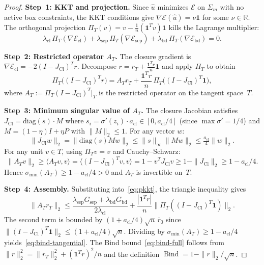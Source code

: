 \documentclass[lettersize,journal]{IEEEtran}
\DeclareMathOperator{\Cl}{Cl}
\DeclareMathOperator{\Bind}{Bind}
\begin{document}
\begin{proof}
\textbf{Step~1: KKT and projection.} Since $\hat{u}$ minimizes $\mathcal{E}$ on $\Sigma_m$ with no active box constraints, the KKT conditions give $\nabla\mathcal{E}(\hat{u}) = \nu\mathbf{1}$ for some $\nu \in \mathbb{R}$. The orthogonal projection $\Pi_T(v) = v - \frac{1}{n}(\mathbf{1}^T v)\mathbf{1}$ kills the Lagrange multiplier:
\begin{equation}
\label{eq:pkkt}
\lambda_{\mathrm{cl}}\,\Pi_T(\nabla\mathcal{E}_{\mathrm{cl}}) + \lambda_{\mathrm{sep}}\,\Pi_T(\nabla\mathcal{E}_{\mathrm{sep}}) + \lambda_{\mathrm{bd}}\,\Pi_T(\nabla\mathcal{E}_{\mathrm{bd}}) = 0. \tag{P-KKT}
\end{equation}

\textbf{Step~2: Restricted operator $A_T$.} The closure gradient is $\nabla\mathcal{E}_{\mathrm{cl}} = -2(I - J_{\Cl})^T r$. Decompose $r = r_T + \frac{\mathbf{1}^T r}{n}\mathbf{1}$ and apply $\Pi_T$ to obtain
\[
\Pi_T\bigl((I - J_{\Cl})^T r\bigr) = A_T r_T + \frac{\mathbf{1}^T r}{n}\,\Pi_T\bigl((I - J_{\Cl})^T \mathbf{1}\bigr),
\]
where $A_T := \Pi_T(I - J_{\Cl})^T|_T$ is the restricted operator on the tangent space~$T$.

\textbf{Step~3: Minimum singular value of $A_T$.} The closure Jacobian satisfies $J_{\Cl} = \mathrm{diag}(s) \cdot M$ where $s_i = \sigma'(z_i) \cdot a_{\mathrm{cl}} \in [0, a_{\mathrm{cl}}/4]$ (since $\max \sigma' = 1/4$) and $M = (1-\eta)I + \eta P$ with $\|M\|_2 \leq 1$. For any vector $w$:
\[
\|J_{\Cl} w\|_2 = \|\mathrm{diag}(s) Mw\|_2 \leq \|s\|_\infty \|Mw\|_2 \leq \tfrac{a_{\mathrm{cl}}}{4}\|w\|_2.
\]
For any unit $v \in T$, using $\Pi_T v = v$ and Cauchy--Schwarz:
\[
\|A_T v\|_2 \geq \langle A_T v, v\rangle = \langle (I - J_{\Cl})^T v, v\rangle = 1 - v^T J_{\Cl} v \geq 1 - \|J_{\Cl}\|_2 \geq 1 - a_{\mathrm{cl}}/4.
\]
Hence $\sigma_{\min}(A_T) \geq 1 - a_{\mathrm{cl}}/4 > 0$ and $A_T$ is invertible on~$T$.

\textbf{Step~4: Assembly.} Substituting into~\eqref{eq:pkkt}, the triangle inequality gives
\[
\|A_T r_T\|_2 \leq \frac{\lambda_{\mathrm{sep}} G_{\mathrm{sep}} + \lambda_{\mathrm{bd}} G_{\mathrm{bd}}}{2\lambda_{\mathrm{cl}}} + \frac{|\mathbf{1}^T r|}{n}\|\Pi_T((I - J_{\Cl})^T \mathbf{1})\|_2.
\]
The second term is bounded by $(1 + a_{\mathrm{cl}}/4)\sqrt{n}\,\bar{r}_0$ since $\|(I - J_{\Cl})^T \mathbf{1}\|_2 \leq (1 + a_{\mathrm{cl}}/4)\sqrt{n}$. Dividing by $\sigma_{\min}(A_T) \geq 1 - a_{\mathrm{cl}}/4$ yields~\eqref{eq:bind-tangential}. The Bind bound~\eqref{eq:bind-full} follows from $\|r\|_2^2 = \|r_T\|_2^2 + (\mathbf{1}^T r)^2/n$ and the definition $\Bind = 1 - \|r\|_2/\sqrt{n}$.


\end{proof}
\end{document}
